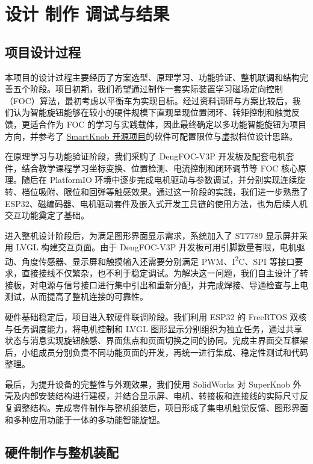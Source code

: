 \section{设计 制作 调试与结果}

\subsection{项目设计过程}

本项目的设计过程主要经历了方案选型、原理学习、功能验证、整机联调和结构完善五个阶段。项目初期，我们希望通过制作一套实际装置学习磁场定向控制（FOC）算法，最初考虑以平衡车为实现目标。经过资料调研与方案比较后，我们认为智能旋钮能够在较小的硬件规模下直观呈现位置闭环、转矩控制和触觉反馈，更适合作为 FOC 的学习与实践载体，因此最终确定以多功能智能旋钮为项目方向，并参考了 \href{https://github.com/scottbez1/smartknob}{SmartKnob 开源项目}的软件可配置限位与虚拟档位设计思路。

在原理学习与功能验证阶段，我们采购了 DengFOC-V3P 开发板及配套电机套件，结合教学课程学习坐标变换、位置检测、电流控制和闭环调节等 FOC 核心原理。随后在 PlatformIO 环境中逐步完成电机驱动与参数调试，并分别实现连续旋转、档位吸附、限位和回弹等触感效果。通过这一阶段的实践，我们进一步熟悉了 ESP32、磁编码器、电机驱动套件及嵌入式开发工具链的使用方法，也为后续人机交互功能奠定了基础。

进入整机设计阶段后，为满足图形界面显示需求，系统加入了 ST7789 显示屏并采用 LVGL 构建交互页面。由于 DengFOC-V3P 开发板可用引脚数量有限，电机驱动、角度传感器、显示屏和触摸输入还需要分别满足 PWM、I\textsuperscript{2}C、SPI 等接口要求，直接接线不仅繁杂，也不利于稳定调试。为解决这一问题，我们自主设计了转接板，对电源与信号接口进行集中引出和重新分配，并完成焊接、导通检查与上电测试，从而提高了整机连接的可靠性。

硬件基础稳定后，项目进入软硬件联调阶段。我们利用 ESP32 的 FreeRTOS 双核与任务调度能力，将电机控制和 LVGL 图形显示分别组织为独立任务，通过共享状态与消息实现旋钮触感、界面焦点和页面切换之间的协同。完成主界面交互框架后，小组成员分别负责不同功能页面的开发，再统一进行集成、稳定性测试和代码整理。

最后，为提升设备的完整性与外观效果，我们使用 SolidWorks 对 SuperKnob 外壳及内部安装结构进行建模，并结合显示屏、电机、转接板和连接线的实际尺寸反复调整结构。完成零件制作与整机组装后，项目形成了集电机触觉反馈、图形界面和多种应用功能于一体的多功能智能旋钮。

\subsection{硬件制作与整机装配}

